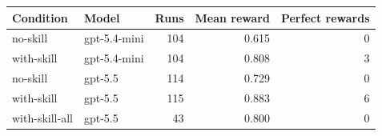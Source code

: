 \begin{tabular}{llrrr}
\toprule
Condition & Model & Runs & Mean reward & Perfect rewards \\
\midrule
no-skill & gpt-5.4-mini & 104 & 0.615 & 0 \\
with-skill & gpt-5.4-mini & 104 & 0.808 & 3 \\
no-skill & gpt-5.5 & 114 & 0.729 & 0 \\
with-skill & gpt-5.5 & 115 & 0.883 & 6 \\
with-skill-all & gpt-5.5 & 43 & 0.800 & 0 \\
\bottomrule
\end{tabular}
